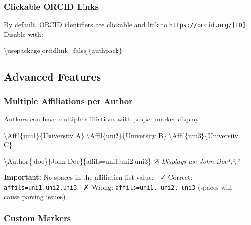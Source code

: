 \documentclass[
]{article}
\newenvironment{Shaded}{}{}
\newcommand{\BuiltInTok}[1]{#1}
\newcommand{\CommentTok}[1]{\textcolor[rgb]{0.38,0.63,0.69}{\textit{#1}}}
\newcommand{\ExtensionTok}[1]{#1}
\newcommand{\FunctionTok}[1]{\textcolor[rgb]{0.02,0.16,0.49}{#1}}
\newcommand{\NormalTok}[1]{#1}
\begin{document}
\hypertarget{clickable-orcid-links}{%
\subsubsection{Clickable ORCID Links}\label{clickable-orcid-links}}

By default, ORCID identifiers are clickable and link to
\texttt{https://orcid.org/{[}ID{]}}. Disable with:

\begin{Shaded}
\begin{Highlighting}[]
\BuiltInTok{\textbackslash{}usepackage}\NormalTok{[orcidlink=false]\{}\ExtensionTok{authpack}\NormalTok{\}}
\end{Highlighting}
\end{Shaded}

\hypertarget{advanced-features}{%
\subsection{Advanced Features}\label{advanced-features}}

\hypertarget{multiple-affiliations-per-author}{%
\subsubsection{Multiple Affiliations per
Author}\label{multiple-affiliations-per-author}}

Authors can have multiple affiliations with proper marker display:

\begin{Shaded}
\begin{Highlighting}[]
\FunctionTok{\textbackslash{}Affil}\NormalTok{\{uni1\}\{University A\}}
\FunctionTok{\textbackslash{}Affil}\NormalTok{\{uni2\}\{University B\}}
\FunctionTok{\textbackslash{}Affil}\NormalTok{\{uni3\}\{University C\}}

\FunctionTok{\textbackslash{}Author}\NormalTok{\{jdoe\}\{John Doe\}\{affils=uni1,uni2,uni3\}}
\CommentTok{\% Displays as: John Doe¹,²,³}
\end{Highlighting}
\end{Shaded}

\textbf{Important:} No spaces in the affiliation list value: - ✓
Correct: \texttt{affils=uni1,uni2,uni3} - ✗ Wrong:
\texttt{affils=uni1,\ uni2,\ uni3} (spaces will cause parsing issues)

\hypertarget{custom-markers}{%
\subsubsection{Custom Markers}\label{custom-markers}}
\end{document}
